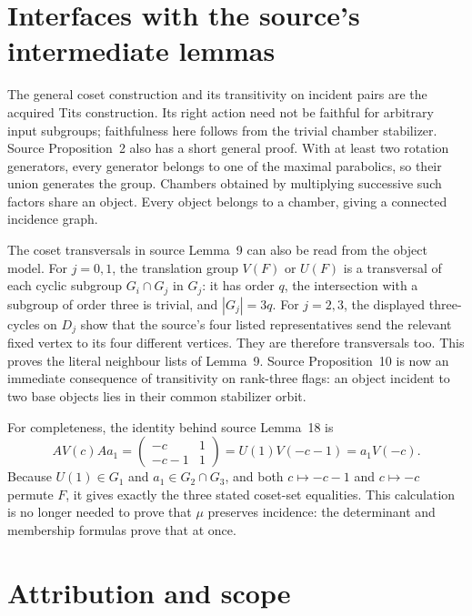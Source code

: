 \documentclass[11pt,a4paper]{article}
\begin{document}
\section{Interfaces with the source's intermediate lemmas}

The general coset construction and its transitivity on incident
pairs are the acquired Tits construction. Its right action need
not be faithful for arbitrary input subgroups; faithfulness here
follows from the trivial chamber stabilizer. Source Proposition~2
also has a short general proof. With at least two rotation
generators, every generator belongs to one of the maximal
parabolics, so their union generates the group. Chambers obtained
by multiplying successive such factors share an object. Every
object belongs to a chamber, giving a connected incidence graph.

The coset transversals in source Lemma~9 can also be read from
the object model. For $j=0,1$, the translation group $V(F)$ or
$U(F)$ is a transversal of each cyclic subgroup
$G_i\cap G_j$ in $G_j$: it has order $q$, the intersection
with a subgroup of order three is trivial, and $|G_j|=3q$.
For $j=2,3$, the displayed three-cycles on $D_j$ show that the
source's four listed representatives send the relevant fixed
vertex to its four different vertices. They are therefore
transversals too. This proves the literal neighbour lists of
Lemma~9. Source Proposition~10 is now an immediate consequence
of transitivity on rank-three flags: an object incident to two
base objects lies in their common stabilizer orbit.

For completeness, the identity behind source Lemma~18 is
\[
 A V(c) A a_1
   =\begin{pmatrix}-c&1\\-c-1&1\end{pmatrix}
   =U(1)V(-c-1)=a_1V(-c).
\]
Because $U(1)\in G_1$ and $a_1\in G_2\cap G_3$, and both
$c\mapsto-c-1$ and $c\mapsto-c$ permute $F$, it gives
exactly the three stated coset-set equalities. This calculation
is no longer needed to prove that $\mu$ preserves incidence:
the determinant and membership formulas prove that at once.

\section{Attribution and scope}
\end{document}
